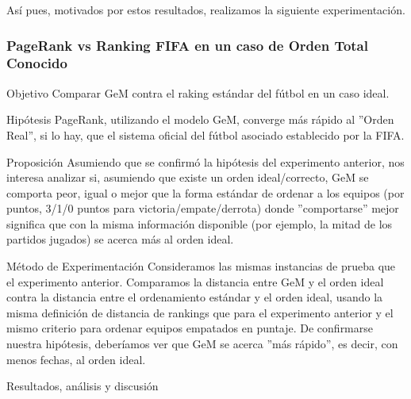 \par As\'i pues, motivados por estos resultados, realizamos la siguiente
experimentaci\'on.

\subsubsection*{PageRank vs Ranking FIFA en un caso de Orden Total Conocido}
\label{subsec:exp5_aux}
\begin{LaTeXdescription}
    \item[Objetivo] Comparar GeM contra el raking est\'andar del f\'utbol en un
        caso ideal.\\

    \item[Hip\'otesis] PageRank, utilizando el modelo GeM, converge m\'as
        r\'apido al ''Orden Real'', si lo hay, que el sistema oficial del
        f\'utbol asociado establecido por la FIFA\cite{fifa}.\\

    \item[Proposici\'on] Asumiendo que se confirm\'o la hip\'otesis del
        experimento anterior, nos interesa analizar si, asumiendo que existe un
        orden ideal/correcto, GeM se comporta peor, igual o mejor que la forma
        est\'andar de ordenar a los equipos (por puntos, 3/1/0 puntos para
        victoria/empate/derrota) donde ''comportarse'' mejor significa que con
        la misma información disponible (por ejemplo, la mitad de los partidos
        jugados) se acerca m\'as al orden ideal.\\

    \item[M\'etodo de Experimentaci\'on] Consideramos las mismas instancias de
        prueba que el experimento anterior. Comparamos la distancia entre GeM y
        el orden ideal contra la distancia entre el ordenamiento est\'andar y el
        orden ideal, usando la misma definici\'on de distancia de rankings que
        para el experimento anterior y el mismo criterio para ordenar equipos
        empatados en puntaje. De confirmarse nuestra hip\'otesis, deber\'iamos
        ver que GeM se acerca ''m\'as r\'apido'', es decir, con menos fechas, al
        orden ideal.\\

    \item[Resultados, an\'alisis y discusi\'on] 
\end{LaTeXdescription}

